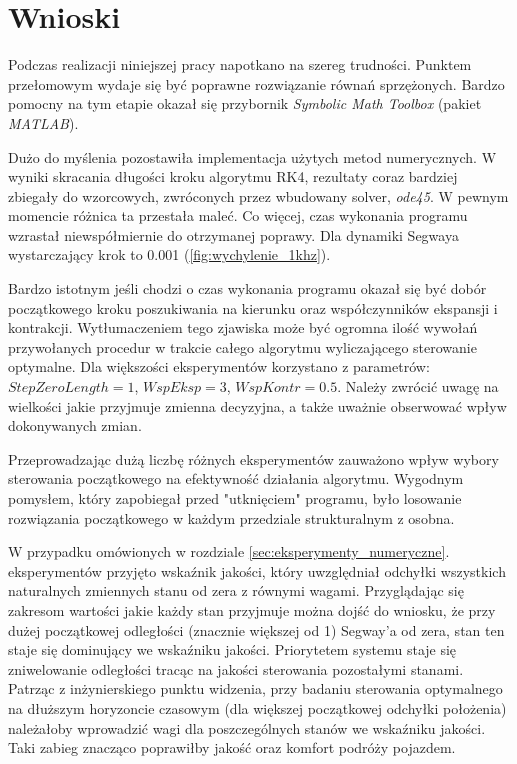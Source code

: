 \section{Wnioski}
\label{sec:wnioski}

Podczas realizacji niniejszej pracy napotkano na szereg trudności. Punktem przełomowym wydaje się być poprawne rozwiązanie równań sprzężonych. Bardzo pomocny na tym etapie okazał się przybornik \textit{Symbolic Math Toolbox} (pakiet \textit{MATLAB}).

Dużo do myślenia pozostawiła implementacja użytych metod numerycznych. W wyniki skracania długości kroku algorytmu RK4, rezultaty coraz bardziej zbiegały do wzorcowych, zwróconych przez wbudowany solver, \textit{ode45}. W pewnym momencie różnica ta przestała maleć. Co więcej, czas wykonania programu wzrastał niewspółmiernie do otrzymanej poprawy. Dla dynamiki Segwaya wystarczający krok to 0.001 (\ref{fig:wychylenie_1khz}).

Bardzo istotnym jeśli chodzi o czas wykonania programu okazał się być dobór początkowego kroku poszukiwania na kierunku oraz współczynników  ekspansji i kontrakcji. Wytłumaczeniem tego zjawiska może być ogromna ilość wywołań przywołanych procedur w trakcie całego algorytmu wyliczającego sterowanie optymalne. Dla większości eksperymentów korzystano z parametrów: $StepZeroLength = 1$, $WspEksp = 3$, $WspKontr = 0.5$. Należy zwrócić uwagę na wielkości jakie przyjmuje zmienna decyzyjna, a także uważnie obserwować wpływ dokonywanych zmian.

Przeprowadzając dużą liczbę różnych eksperymentów zauważono wpływ wybory sterowania początkowego na efektywność działania algorytmu. Wygodnym pomysłem, który zapobiegał przed "utknięciem" programu, było losowanie rozwiązania początkowego w każdym przedziale strukturalnym z osobna.

W przypadku omówionych w rozdziale \ref{sec:eksperymenty_numeryczne}. eksperymentów przyjęto wskaźnik jakości, który uwzględniał odchyłki wszystkich naturalnych zmiennych stanu od zera z równymi wagami. Przyglądając się zakresom wartości jakie każdy stan przyjmuje można dojść do wniosku, że przy dużej początkowej odległości (znacznie większej od 1) Segway'a od zera, stan ten staje się dominujący we wskaźniku jakości. Priorytetem systemu staje się zniwelowanie odległości tracąc na jakości sterowania pozostałymi stanami. Patrząc z inżynierskiego punktu widzenia, przy badaniu sterowania optymalnego na dłuższym horyzoncie czasowym (dla większej początkowej odchyłki położenia) należałoby wprowadzić wagi dla poszczególnych stanów we wskaźniku jakości. Taki zabieg znacząco poprawiłby jakość oraz komfort podróży pojazdem.
